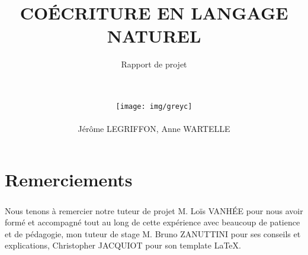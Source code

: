 \documentclass[
    12pt,
	headsepline=on,
	footsepline=on,
	twoside=off,
	abstract=on,
	DIV=10
]{scrreprt}
\title{
	\hrulefill
	\vfill
	\Huge \bfseries COÉCRITURE EN LANGAGE NATUREL
}
\subtitle{
	Rapport de projet\\
	\hfill
	\\
	\hrulefill
	\hfill\\
}
\author{
	\small
	\texttt{[image: img/greyc]}\\
	\hfill\\
	Jérôme LEGRIFFON, Anne WARTELLE
}
\date{}
\begin{document}
	\maketitle
	
	
	\tableofcontents
	
	\chapter*{Remerciements}
		\paragraph{} 
			Nous tenons à remercier notre tuteur de projet M. Loïs VANHÉE pour nous avoir formé et accompagné tout au long de cette expérience avec beaucoup de patience et de pédagogie, mon tuteur de stage M. Bruno ZANUTTINI pour ses conseils et explications, Christopher JACQUIOT pour son template \LaTeX.
			\clearpage
	

    
    
    
    
    
    
    
	\cleardoublepage
	\pagebreak
	
	
	\begin{thebibliography}{}
	   
        
	\end{thebibliography}

	
	
	
	
\end{document}
